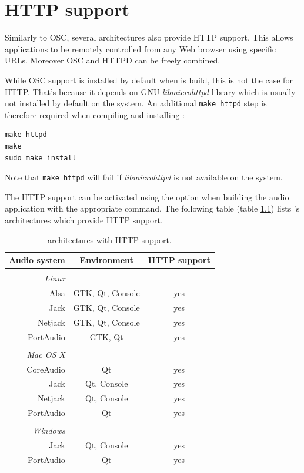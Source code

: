 \chapter{HTTP support} 
\label{sec:http}

Similarly to OSC, several \faust architectures also provide HTTP support. This allows \faust applications to be remotely controlled from any Web browser using specific URLs. Moreover OSC and HTTPD can be freely combined.

While OSC support is installed by default when \faust is build, this is not the case for HTTP. That's because it depends on GNU \emph{libmicrohttpd} library which is usually not installed by default on the system. An additional \lstinline'make httpd' step is therefore required when compiling and installing \faust:
\begin{lstlisting}
make httpd
make
sudo make install
\end{lstlisting}
Note that \lstinline'make httpd' will fail if \emph{libmicrohttpd} is not available on the system.

The HTTP support can be activated using the  option when building the audio application with the appropriate  command. The following table (table \ref{tab:httparch}) lists \faust's architectures which provide HTTP support. 

\begin{table}[htp]
\begin{center}
\begin{tabular}{rcc}
\hline
\bf{Audio system} 	& \bf{Environment} & \bf{HTTP support}	\\
\hline
\\
\emph{Linux}\\
Alsa  			& GTK, Qt, Console		& yes\\
Jack 			& GTK, Qt, Console		& yes\\
Netjack 			& GTK, Qt, Console & yes\\
PortAudio 		& GTK, Qt				& yes\\
\\
\emph{Mac OS X} \\
CoreAudio 		& Qt 			& yes\\
Jack 			& Qt, Console & yes\\
Netjack 			& Qt, Console & yes\\
PortAudio 		& Qt 			& yes\\
\\
\emph{Windows} \\
Jack 			& Qt, Console & yes\\
PortAudio 		& Qt 			& yes\\
\hline
\end{tabular}
\end{center}
\caption{\faust architectures with HTTP support.}
\label{tab:httparch}
\end{table}


